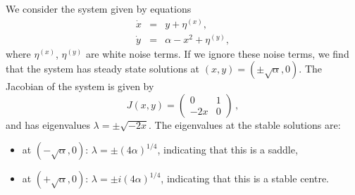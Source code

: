 We consider the system given by equations
	\begin{equation}
		\begin{array}{rcl}
		\dot{x} &=& y + \eta^{(x)},\\
		\dot{y} &=& \alpha - x^2 + \eta^{(y)},
		\end{array}
	\label{eqn:2D:homoclinicSystem}
	\end{equation}
where $\eta^{(x)}$, $\eta^{(y)}$ are white noise terms. If we ignore these noise terms, we find that the system has steady state solutions at $(x,y) = (\pm \sqrt{\alpha},0)$. The Jacobian of the system is given by 
	\begin{equation}
		J(x,y) = \left(\begin{array}{cc}
		0 & 1 \\ -2x & 0
		\end{array}\right)\,,
	\label{eqn:2D:homoclinicJacobian}
	\end{equation}
and has eigenvalues $\lambda = \pm \sqrt{-2x}$. The eigenvalues at the stable solutions are:
\begin{itemize}
	\item at $(-\sqrt{\alpha},0)$: $\lambda = \pm(4\alpha)^{1/4}$, indicating that this is a saddle,
	\item at $(+\sqrt{\alpha},0)$: $\lambda = \pm i(4\alpha)^{1/4}$, indicating that this is a stable centre.
\end{itemize}
